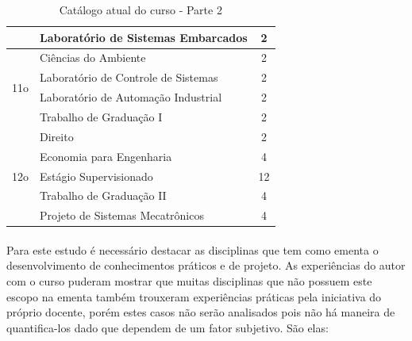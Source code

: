 \documentclass[12pt]{article} %
\begin{document}
\begin{table}[H]
\begin{tabular}{|c|l|c|}
                     & Laboratório de Sistemas Embarcados                         & 2        \\ \hline
\multirow{4}{*}{11o} & Ciências do Ambiente                                       & 2        \\ \cline{2-3} 
                     & Laboratório de Controle de Sistemas                        & 2        \\ \cline{2-3} 
                     & Laboratório de Automação Industrial                        & 2        \\ \cline{2-3} 
                     & Trabalho de Graduação I                                    & 2        \\ \hline
\multirow{5}{*}{12o} & Direito                                                    & 2        \\ \cline{2-3} 
                     & Economia para Engenharia                                   & 4        \\ \cline{2-3} 
                     & Estágio Supervisionado                                     & 12       \\ \cline{2-3} 
                     & Trabalho de Graduação II                                   & 4        \\ \cline{2-3} 
                     & Projeto de Sistemas Mecatrônicos                           & 4        \\ \hline
\end{tabular}
\caption{Catálogo atual do curso -  Parte 2}
\label{catalago2}
\end{table}

\pagebreak

\paragraph{} Para este estudo é necessário destacar as disciplinas que tem como ementa o desenvolvimento de conhecimentos práticos e de projeto. As experiências do autor com o curso puderam mostrar que muitas disciplinas que não possuem este escopo na ementa também trouxeram experiências práticas pela iniciativa do próprio docente, porém estes casos não serão analisados pois não há maneira de quantifica-los dado que dependem de um fator subjetivo. São elas:
\end{document}
